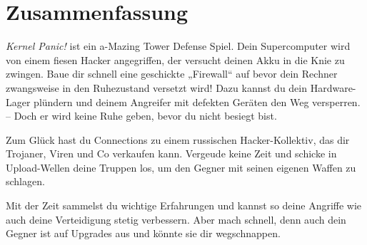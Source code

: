 \section{Zusammenfassung}


\textit{Kernel Panic!} ist ein a-Mazing Tower Defense Spiel.
Dein Supercomputer wird von einem fiesen Hacker angegriffen, der versucht deinen Akku in die Knie zu zwingen.
Baue dir schnell eine geschickte „Firewall“ auf bevor dein Rechner zwangsweise in den Ruhezustand versetzt wird! Dazu kannst du dein Hardware-Lager plündern und deinem Angreifer mit defekten Geräten den Weg versperren. -- Doch er wird keine Ruhe geben, bevor du nicht besiegt bist.

Zum Glück hast du Connections zu einem russischen Hacker-Kollektiv, das dir Trojaner, Viren und Co verkaufen kann. Vergeude keine Zeit und schicke in Upload-Wellen deine Truppen los, um den Gegner mit seinen eigenen Waffen zu schlagen.

Mit der Zeit sammelst du wichtige Erfahrungen und kannst so deine Angriffe wie auch deine Verteidigung stetig verbessern. Aber mach schnell, denn auch dein Gegner ist auf Upgrades aus und könnte sie dir wegschnappen.
